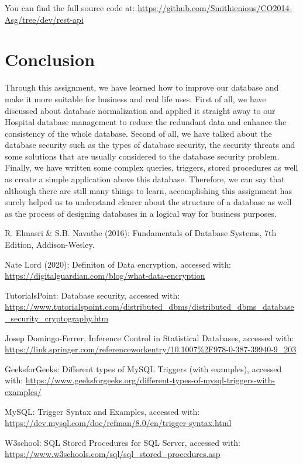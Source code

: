\documentclass[a4paper]{article}
\numberwithin{equation}{section}
\begin{document}
You can find the full source code at:  \url{https://github.com/Smithienious/CO2014-Asg/tree/dev/rest-api}

\section{Conclusion}
Through this assignment, we have learned how to improve our database and make it more suitable for business and real life uses.
First of all, we have discussed about database normalization  and applied it straight away to our Hospital database management to reduce the redundant data and enhance the consistency of the whole database.
Second of all, we have talked about the database security such as the types of database security, the security threats and some solutions that are usually considered to the database security problem.
Finally, we have written some complex queries, triggers, stored procedures as well as create a simple application above this database.
Therefore, we can say that although there are still many things to learn, accomplishing this assignment has surely helped us to understand clearer about the structure of a database as well as the process of designing databases in a logical way for business purposes.

\pagebreak
\begin{thebibliography}{9}
  R.
  Elmasri \& S.B.
  Navathe (2016): Fundamentals of Database Systems, 7th
  Edition, Addison-Wesley.

  Nate Lord (2020): Definiton of Data encryption, accessed with: \url{https://digitalguardian.com/blog/what-data-encryption}

  TutorialsPoint: Database security, accessed with: \url{https://www.tutorialspoint.com/distributed_dbms/distributed_dbms_database_security_cryptography.htm}

  Josep Domingo-Ferrer, Inference Control in Statistical Databases, accessed with: \url{https://link.springer.com/referenceworkentry/10.1007\%2F978-0-387-39940-9_203}

  GeeksforGeeks: Different types of MySQL Triggers (with examples), accessed with: \url{https://www.geeksforgeeks.org/different-types-of-mysql-triggers-with-examples/}

  MySQL\@: Trigger Syntax and Examples, accessed with: \url{https://dev.mysql.com/doc/refman/8.0/en/trigger-syntax.html}

  W3school: SQL Stored Procedures for SQL Server, accessed with: \url{https://www.w3schools.com/sql/sql_stored_procedures.asp}

\end{thebibliography}
\end{document}
